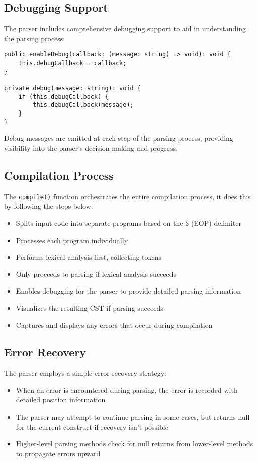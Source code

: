 \documentclass[12pt]{article}
\begin{document}
\subsection{Debugging Support}
The parser includes comprehensive debugging support to aid in understanding the parsing process:

\begin{lstlisting}
public enableDebug(callback: (message: string) => void): void {
    this.debugCallback = callback;
}

private debug(message: string): void {
    if (this.debugCallback) {
        this.debugCallback(message);
    }
}
\end{lstlisting}

Debug messages are emitted at each step of the parsing process, providing visibility into the parser's decision-making and progress.

\subsection{Compilation Process}
The \texttt{compile()} function orchestrates the entire compilation process, it does this by following the steps below:
\begin{itemize}
    \item Splits input code into separate programs based on the \$ (EOP) delimiter
    \item Processes each program individually
    \item Performs lexical analysis first, collecting tokens
    \item Only proceeds to parsing if lexical analysis succeeds
    \item Enables debugging for the parser to provide detailed parsing information
    \item Visualizes the resulting CST if parsing succeeds
    \item Captures and displays any errors that occur during compilation
\end{itemize}

\subsection{Error Recovery}
The parser employs a simple error recovery strategy:
\begin{itemize}
    \item When an error is encountered during parsing, the error is recorded with detailed position information
    \item The parser may attempt to continue parsing in some cases, but returns null for the current construct if recovery isn't possible
    \item Higher-level parsing methods check for null returns from lower-level methods to propagate errors upward
\end{itemize}
\end{document}

